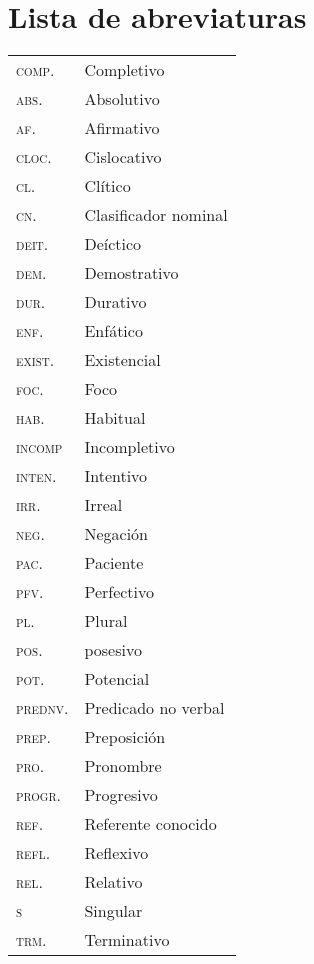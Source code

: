 \section*{Lista de abreviaturas}

      \begin{tabular}{ll}
      \textsc{comp.} & Completivo \\
      \textsc{abs.} & Absolutivo \\
      \textsc{af.} & Afirmativo \\
      \textsc{cloc.} & Cislocativo \\
      \textsc{cl.} & Clítico \\
      \textsc{cn.} & Clasificador nominal \\
      \textsc{deit.} & Deíctico \\
      \textsc{dem.} & Demostrativo \\
      \textsc{dur.} & Durativo \\
      \textsc{enf.} & Enfático \\
      \textsc{exist.} & Existencial \\
      \textsc{foc.} & Foco \\
      \textsc{hab.} & Habitual \\
      \textsc{incomp} & Incompletivo \\
      \textsc{inten.} & Intentivo \\
      \textsc{irr.} & Irreal \\
      \textsc{neg.} & Negación \\
      \textsc{pac.} & Paciente \\
      \textsc{pfv.} & Perfectivo \\
      \textsc{pl.} & Plural \\
      \textsc{pos.} & posesivo \\
      \textsc{pot.} & Potencial \\
      \textsc{prednv.} & Predicado no verbal \\
      \textsc{prep.} & Preposición \\
      \textsc{pro.} & Pronombre \\
      \textsc{progr.} & Progresivo \\
      \textsc{ref.} & Referente conocido\\
      \textsc{refl.} & Reflexivo \\
      \textsc{rel.} & Relativo \\
      \textsc{s} & Singular \\
      \textsc{trm.} & Terminativo 
      \end{tabular}%